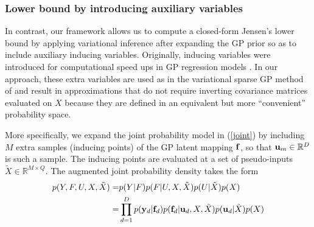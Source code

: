 \subsubsection{Lower bound by introducing auxiliary variables}
\par In contrast, our framework allows us to compute
a closed-form Jensen's lower bound
by applying variational inference after expanding the GP prior so as to include auxiliary inducing
variables. Originally, inducing variables were introduced for computational speed ups in GP regression models
\cite{Csato:sparse02,Seeger:fast03,Csato:thesis02,Snelson:pseudo05,Quinonero:unifying05,Titsias:variational09}.
 In our approach, these extra variables are used as in the variational sparse GP method of
\cite{Titsias:variational09} and result in approximations that do not require inverting covariance
matrices evaluated on $X$ because they are defined in an equivalent but more ``convenient''
probability space.

More specifically, we expand the joint
probability model in (\ref{joint}) by including $M$ extra samples (inducing points) of
the GP latent mapping $\mathbf{f}$, so that
$\mathbf{u}_m \in \mathbb{R}^D$ is such a sample. The inducing points are
evaluated at a set of pseudo-inputs $\tilde{X} \in \mathbb{R}^{M
\times Q}$.
%
%
The augmented joint probability density takes the form
\begin{align}
p(Y,F, U,X,\tilde{X})  
=& p(Y|F) p(F|U,X,\tilde{X}) p(U|\tilde{X})p(X) \nonumber \\
=& \prod_{d=1}^D p(\mathbf{y}_d | \mathbf{f}_d) p(\mathbf{f}_d | \mathbf{u}_d, X, \tilde{X}) p(\mathbf{u}_d | \tilde{X}) p(X)     \label{augmentedJoint}
\end{align}


